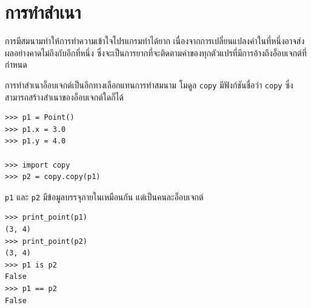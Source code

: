 \section{การทำสำเนา} %
\label{copying}


การมีสมนามทำให้การทำความเข้าใจโปรแกรมทำได้ยาก เนื่องจากการเปลี่ยนแปลงค่าในที่หนึ่งอาจส่งผลอย่างคาดไม่ถึงกับอีกที่หนึ่ง 
ซึ่งจะเป็นการยากที่จะติดตามค่าของทุกตัวแปรที่มีการอ้างถึงอ็อบเจกต์ที่กำหนด



การทำสำเนาอ็อบเจกต์เป็นอีกทางเลือกแทนการทำสมนาม โมดูล {\tt copy} มีฟังก์ชันชื่อว่า {\tt copy} ซึ่งสามารถสร้างสำเนาของอ็อบเจกต์ใดก็ได้

\begin{verbatim}
>>> p1 = Point()
>>> p1.x = 3.0
>>> p1.y = 4.0

>>> import copy
>>> p2 = copy.copy(p1)
\end{verbatim}
%

{\tt p1} และ {\tt p2} มีข้อมูลบรรจุภายในเหมือนกัน แต่เป็นคนละอ็อบเจกต์

\begin{verbatim}
>>> print_point(p1)
(3, 4)
>>> print_point(p2)
(3, 4)
>>> p1 is p2
False
>>> p1 == p2
False
\end{verbatim}
%

